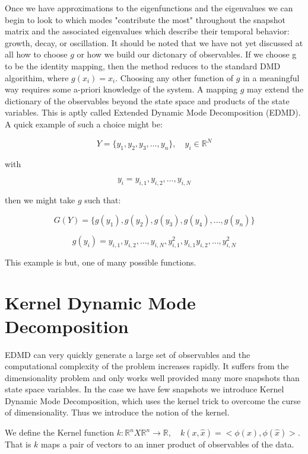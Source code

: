 \vspace{3mm}

Once we have approximations to the eigenfunctions and the eigenvalues we can begin to look to which modes
"contribute the most" throughout the snapshot matrix and the associated eigenvalues which describe
their temporal behavior: growth, decay, or oscillation. It should be noted that we have not yet 
discussed at all how to choose $g$ or how we build our dictonary of observables. If we choose g to 
be the identity mapping, then the method reduces to the standard DMD algorithim, where $g(x_i) = x_i$.
Choosing any other function of $g$ in a meaningful way requires some a-priori knowledge of the system.
A mapping $g$ may extend the dictionary of the observables beyond the state space and products of 
the state variables. This is aptly called Extended Dynamic Mode Decomposition (EDMD). \cite{doi:10.1137/1.9781611974508} A quick example of such
a choice might be:

$$
Y = \{y_1, y_2, y_3, \dots, y_n  \}, \quad y_i \in \mathbb{R}^{N}
$$

with 

$$
y_i = {y_{i,1}, y_{i,2},\dots, y_{i,N}} 
$$

then we might take $g$ such that:

$$
G(Y) = \{g(y_1), g(y_2), g(y_3), g(y_4), \dots , g(y_n)\}
$$

$$
g(y_i) = {y_{i,1}, y_{i,2},\dots, y_{i,N}, y^{2}_{i,1}, y_{i,1}y_{i,2}, \dots, y^{2}_{i,N}} 
$$

This example is but, one of many possible functions.

\section{Kernel Dynamic Mode Decomposition}

EDMD can very quickly generate a large set of observables
and the computational complexity of the problem increases rapidly. It suffers from the 
dimensionality problem and only works well provided many more snapshots than state space
variables. In the case we have few snapshots we introduce Kernel Dynamic Mode Decomposition,
which uses the kernel trick to overcome the curse of dimensionality\cite{doi:10.1137/1.9781611974508}. 
Thus we introduce the notion of the kernel.

\begin{dfn}
    We define the Kernel function $k:\mathbb{R}^n X \mathbb{R}^n \rightarrow \mathbb{R}, \quad k(x,{\hat x}) = <\phi(x), \phi({\hat x})>$.
     That is $k$ maps a pair of vectors to an inner product of observables of the data.
\end{dfn}

